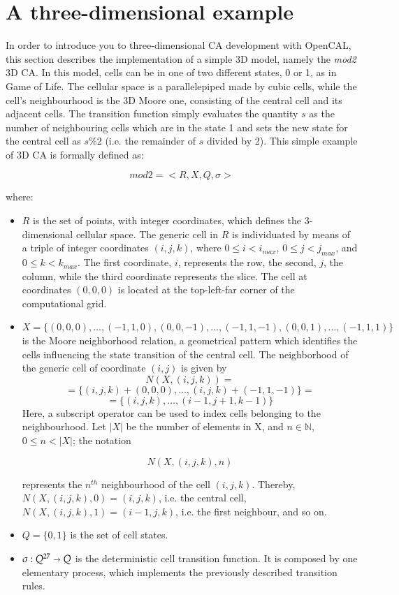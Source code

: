 \section{A three-dimensional example}\label{sec:mod2}

In order to introduce you to three-dimensional CA development with
OpenCAL, this section describes the implementation of a simple 3D
model, namely the \emph{mod2} 3D CA. In this model, cells can be in
one of two different states, 0 or 1, as in Game of Life. The cellular
space is a parallelepiped made by cubic cells, while the cell's
neighbourhood is the 3D Moore one, consisting of the central cell and
its adjacent cells. The transition function simply evaluates the
quantity $s$ as the number of neighbouring cells which are in the
state 1 and sets the new state for the central cell as $s\%2$
(i.e. the remainder of $s$ divided by 2). This simple example of 3D CA
is formally defined as:

$$mod2 = < R, X, Q, \sigma >$$

where:

\begin{itemize}

\item $R$ is the set of points, with integer coordinates, which
  defines the 3-dimensional cellular space. The generic cell in $R$ is
  individuated by means of a triple of integer coordinates $(i, j,
  k)$, where $0 \leq i < i_{max}$, $0 \leq j < j_{max}$, and $0 \leq k
  < k_{max}$. The first coordinate, $i$, represents the row, the
  second, $j$, the column, while the third coordinate represents the
  slice. The cell at coordinates $(0,0,0)$ is located at the
  top-left-far corner of the computational grid.

\item $X = \{(0,0,0), \dots, (-1,1,0), (0,0,-1), \dots, (-1,1,-1),
  (0,0,1), \dots, (-1,1,1)\}$ is the Moore neighborhood
  relation, a geometrical pattern which identifies the cells
  influencing the state transition of the central cell. The
  neighborhood of the generic cell of coordinate $(i, j)$ is given by
  $$N(X, (i, j, k)) = $$
  $$= \{(i, j, k)+(0,0,0), \dots, (i, j, k)+(-1,1,-1)\} =$$
  $$= \{(i, j, k), \dots, (i-1,j+1,k-1)\}$$
  Here, a subscript operator can be used to index cells belonging to the
  neighbourhood. Let $|X|$ be the number of elements in X, and $n \in
  \mathbb{N}$, $0 \leq n < |X|$; the notation

  $$N(X, (i, j, k), n)$$

  represents the $n^{th}$ neighbourhood of the cell $(i,j,k)$. Thereby,
  $N(X, (i, j, k), 0) = (i, j, k)$, i.e. the central cell, $N(X, (i, j, k), 1)
  = (i-1, j, k)$, i.e. the first neighbour, and so on.
  
\item $Q = \{0, 1\}$ is the set of cell states.
  
\item $\sigma : Q^{27} \shortrightarrow Q$ is the deterministic cell
  transition function. It is composed by one elementary process, which
  implements the previously described transition rules.
\end{itemize}


